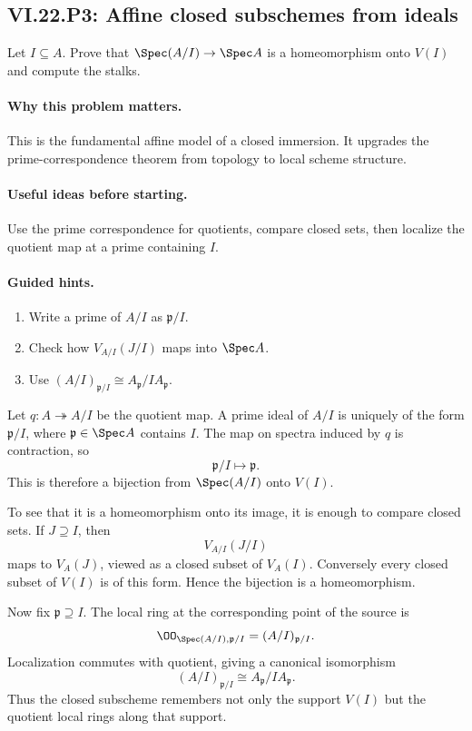 \subsection*{VI.22.P3: Affine closed subschemes from ideals}
\begin{problem}\label{prob:vi22-p03}
Let $I\subseteq A$.  Prove that $\Spec(A/I)\to\Spec A$ is a homeomorphism onto $V(I)$ and compute the stalks.
\end{problem}

\ifdefined\FullProblemDossiers
\paragraph{Why this problem matters.}
This is the fundamental affine model of a closed immersion.  It upgrades the prime-correspondence theorem from topology to local scheme structure.

\paragraph{Useful ideas before starting.}
Use the prime correspondence for quotients, compare closed sets, then localize the quotient map at a prime containing $I$.

\paragraph{Guided hints.}
\begin{enumerate}
\item Write a prime of $A/I$ as $\mathfrak p/I$.
\item Check how $V_{A/I}(J/I)$ maps into $\Spec A$.
\item Use $(A/I)_{\mathfrak p/I}\cong A_{\mathfrak p}/IA_{\mathfrak p}$.
\end{enumerate}

\begin{solution}
Let $q:A\twoheadrightarrow A/I$ be the quotient map.  A prime ideal of
$A/I$ is uniquely of the form $\mathfrak p/I$, where $\mathfrak p\in\Spec A$ contains $I$.
The map on spectra induced by $q$ is contraction, so
\[
 \mathfrak p/I\longmapsto \mathfrak p.
\]
This is therefore a bijection from $\Spec(A/I)$ onto $V(I)$.

To see that it is a homeomorphism onto its image, it is enough to compare closed sets.  If
$J\supseteq I$, then
\[
 V_{A/I}(J/I)
\]
maps to $V_A(J)$, viewed as a closed subset of $V_A(I)$.  Conversely every closed subset of
$V(I)$ is of this form.  Hence the bijection is a homeomorphism.

Now fix $\mathfrak p\supseteq I$.  The local ring at the corresponding point of the source is
\[
 \OO_{\Spec(A/I),\mathfrak p/I}=(A/I)_{\mathfrak p/I}.
\]
Localization commutes with quotient, giving a canonical isomorphism
\[
 (A/I)_{\mathfrak p/I}\cong A_{\mathfrak p}/IA_{\mathfrak p}.
\]
Thus the closed subscheme remembers not only the support $V(I)$ but the quotient local rings
along that support.
\end{solution}

